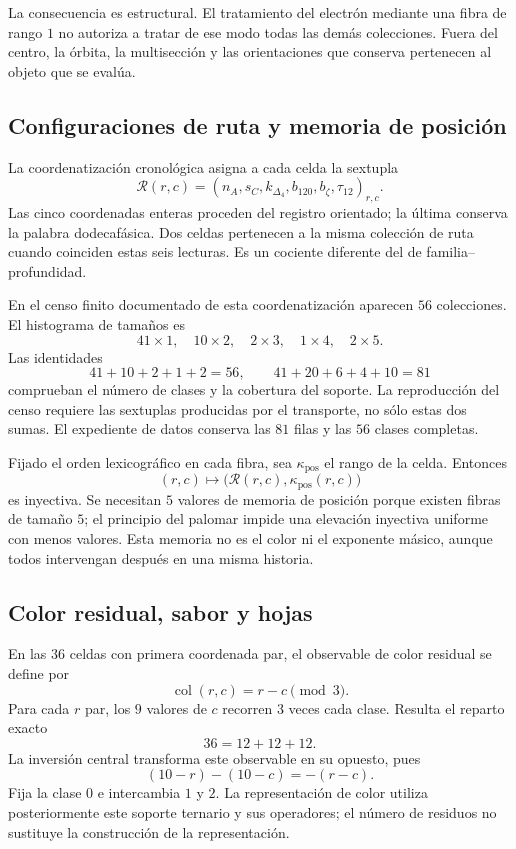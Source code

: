 La consecuencia es estructural. El tratamiento del electrón mediante una
fibra de rango \(1\) no autoriza a tratar de ese modo todas las demás
colecciones. Fuera del centro, la órbita, la multisección y las orientaciones
que conserva pertenecen al objeto que se evalúa.

\subsection{Configuraciones de ruta y memoria de posición}

La coordenatización cronológica asigna a cada celda la sextupla
\[
 \mathcal R(r,c)=
 (n_A,s_C,k_{\Delta_4},b_{120},b_{\zeta},\tau_{12})_{r,c}.
\]
Las cinco coordenadas enteras proceden del registro orientado; la última
conserva la palabra dodecafásica. Dos celdas pertenecen a la misma colección
de ruta cuando coinciden estas seis lecturas. Es un cociente diferente
del de familia--profundidad.

En el censo finito documentado de esta coordenatización aparecen \(56\) colecciones.
El histograma de tamaños es
\[
 41\times1,\quad10\times2,\quad2\times3,\quad1\times4,\quad2\times5.
\]
Las identidades
\[
 41+10+2+1+2=56,\qquad
 41+20+6+4+10=81
\]
comprueban el número de clases y la cobertura del soporte. La reproducción
del censo requiere las sextuplas producidas por el transporte, no sólo estas
dos sumas. El expediente de datos conserva las \(81\) filas y las
\(56\) clases completas.

Fijado el orden lexicográfico en cada fibra, sea \(\kappa_{\mathrm{pos}}\)
el rango de la celda. Entonces
\[
 (r,c)\longmapsto\bigl(\mathcal R(r,c),\kappa_{\mathrm{pos}}(r,c)\bigr)
\]
es inyectiva. Se necesitan \(5\) valores de memoria de posición porque
existen fibras de tamaño \(5\); el principio del palomar impide una
elevación inyectiva uniforme con menos valores. Esta memoria no es el color
ni el exponente másico, aunque todos intervengan después en una misma historia.

\subsection{Color residual, sabor y hojas}

En las \(36\) celdas con primera coordenada par, el observable de color
residual se define por
\[
 \operatorname{col}(r,c)=r-c\pmod3.
\]
Para cada \(r\) par, los \(9\) valores de \(c\) recorren \(3\)
veces cada clase. Resulta el reparto exacto
\[
 36=12+12+12.
\]
La inversión central transforma este observable en su opuesto, pues
\[
 (10-r)-(10-c)=-(r-c).
\]
Fija la clase \(0\) e intercambia \(1\) y \(2\). La representación
de color utiliza posteriormente este soporte ternario y sus operadores;
el número de residuos no sustituye la construcción de la representación.

